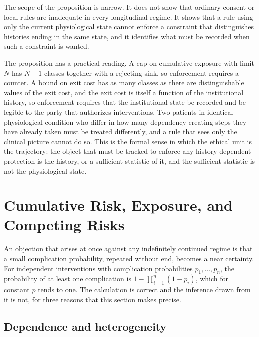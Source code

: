 \documentclass[11pt]{article}
\theoremstyle{plain}
\theoremstyle{definition}
\theoremstyle{remark}
\begin{document}
The scope of the proposition is narrow. It does not show that ordinary consent or local rules are inadequate in every longitudinal regime. It shows that a rule using only the current physiological state cannot enforce a constraint that distinguishes histories ending in the same state, and it identifies what must be recorded when such a constraint is wanted.

The proposition has a practical reading. A cap on cumulative exposure with limit $N$ has $N+1$ classes together with a rejecting sink, so enforcement requires a counter. A bound on exit cost has as many classes as there are distinguishable values of the exit cost, and the exit cost is itself a function of the institutional history, so enforcement requires that the institutional state be recorded and be legible to the party that authorizes interventions. Two patients in identical physiological condition who differ in how many dependency-creating steps they have already taken must be treated differently, and a rule that sees only the clinical picture cannot do so. This is the formal sense in which the ethical unit is the trajectory: the object that must be tracked to enforce any history-dependent protection is the history, or a sufficient statistic of it, and the sufficient statistic is not the physiological state.

\section{Cumulative Risk, Exposure, and Competing Risks}\label{sec:risk}

An objection that arises at once against any indefinitely continued regime is that a small complication probability, repeated without end, becomes a near certainty. For independent interventions with complication probabilities $p_1,\dots,p_n$, the probability of at least one complication is $1-\prod_{i=1}^n(1-p_i)$, which for constant $p$ tends to one. The calculation is correct and the inference drawn from it is not, for three reasons that this section makes precise.

\subsection{Dependence and heterogeneity}
\end{document}
